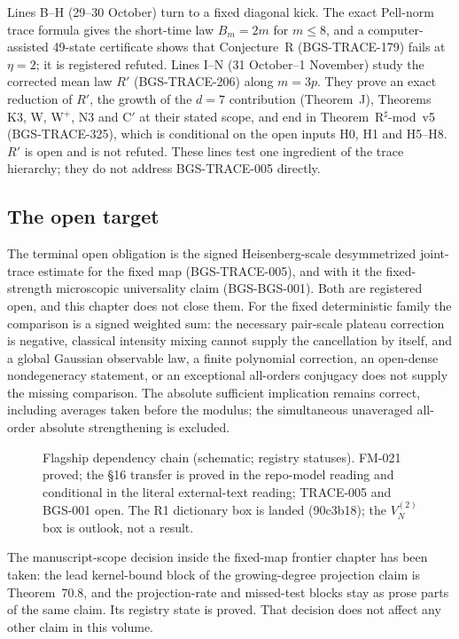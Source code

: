 Lines B--H (29--30 October) turn to a fixed diagonal kick. The exact
Pell-norm trace formula gives the short-time law $B_m=2m$ for $m\le8$,
and a computer-assisted 49-state certificate shows that Conjecture~R
(BGS-TRACE-179) fails at $\eta=2$; it is registered refuted. Lines I--N
(31 October--1 November) study the corrected mean law $R'$
(BGS-TRACE-206) along $m=3p$. They prove an exact reduction of $R'$, the
growth of the $d=7$ contribution (Theorem~J), Theorems K3, W, W$^+$, N3
and C$'$ at their stated scope, and end in Theorem~R$^\sharp$-mod~v5
(BGS-TRACE-325), which is conditional on the open inputs H0, H1 and
H5--H8. $R'$ is open and is not refuted. These lines test one ingredient
of the trace hierarchy; they do not address BGS-TRACE-005 directly.

\subsection{The open target}
The terminal open obligation is the signed Heisenberg-scale
desymmetrized joint-trace estimate for the fixed map (BGS-TRACE-005),
and with it the fixed-strength microscopic universality claim
(BGS-BGS-001). Both are registered open, and this chapter does not
close them. For the fixed
deterministic family the comparison is a signed weighted sum: the
necessary pair-scale plateau correction is negative, classical
intensity mixing cannot supply the cancellation by itself, and a
global Gaussian observable law, a finite polynomial correction, an
open-dense nondegeneracy statement, or an exceptional all-orders
conjugacy does not supply the missing comparison. The absolute
sufficient implication remains correct, including averages taken
before the modulus; the simultaneous unaveraged all-order absolute
strengthening is excluded.

\begin{figure}[htbp]
\centering

\caption{Flagship dependency chain (schematic; registry statuses).
FM-021 proved; the \S16 transfer is proved in the repo-model reading and
conditional in the literal external-text reading; TRACE-005 and BGS-001
open. The R1 dictionary box is landed (90c3b18); the \(V_N^{(2)}\) box is
outlook, not a result.}
\end{figure}

The manuscript-scope decision inside the fixed-map
frontier chapter has been taken: the lead kernel-bound block of the
growing-degree projection claim is Theorem~70.8, and the
projection-rate and missed-test blocks stay as prose parts of the same
claim. Its registry state is proved. That decision does
not affect any other claim in this volume.

